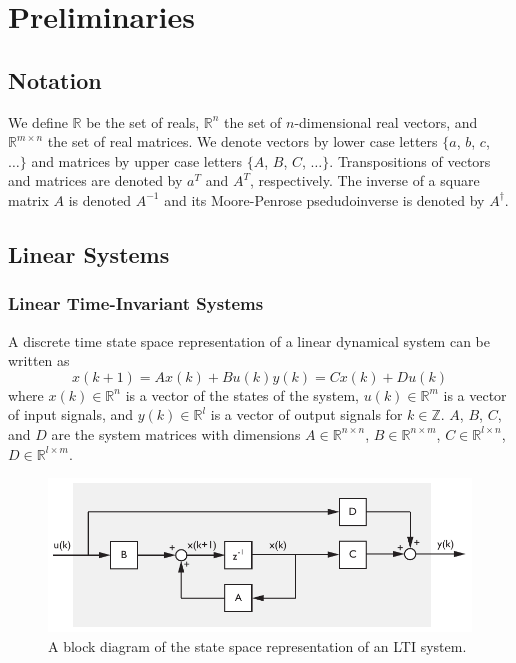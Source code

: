 \chapter{Preliminaries}

\section{Notation}
We define $\mathbb{R}$ be the set of reals, $\mathbb{R}^n$ the set of $n$-dimensional real vectors, and $\mathbb{R}^{m\times n}$ the set of real matrices. We denote vectors by lower case letters $\{a$, $b$, $c$, $\dots\}$ and matrices by upper case letters $\{A$, $B$, $C$, $\dots\}$. Transpositions of vectors and matrices are denoted by $a^T$ and $A^T$, respectively. The inverse of a square matrix $A$ is denoted $A^{-1}$ and its Moore-Penrose psedudoinverse is denoted by $A^\dagger$.

\section{Linear Systems}
\subsection{Linear Time-Invariant Systems}\label{sec:linear_time_invariant_systems}
A discrete time state space representation of a linear dynamical system can be written as
\begin{subequations}\label{eq:2_lti}
\begin{equation}x(k+1) = Ax(k) + Bu(k)\end{equation}
\begin{equation}y(k) = Cx(k) + Du(k)\end{equation}
\end{subequations}
where $x(k) \in \mathbb{R}^n$ is a vector of the states of the system, $u(k) \in \mathbb{R}^m$ is a vector of input signals, and $y(k) \in \mathbb{R}^l$ is a vector of output signals for $k \in \mathbb{Z}$. $A$, $B$, $C$, and $D$ are the system matrices with dimensions $A\in\mathbb{R}^{n\times n}$, $B\in\mathbb{R}^{n\times m}$, $C\in\mathbb{R}^{l\times n}$, $D\in\mathbb{R}^{l\times m}$.
\begin{figure}[htb!]
	\centering
	\includegraphics{../fig/lti_block_diagram.pdf}
	\caption{A block diagram of the state space representation of an LTI system.}
\end{figure}

